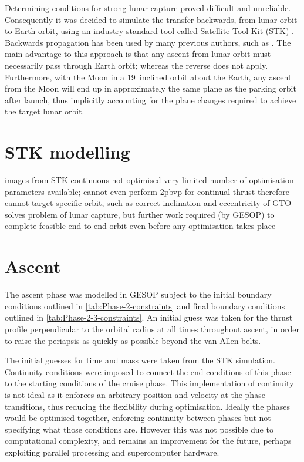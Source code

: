 Determining conditions for strong lunar capture proved difficult and unreliable. Consequently it was decided to simulate the transfer backwards, from lunar orbit to Earth orbit, using an industry standard tool called Satellite Tool Kit (STK) \parencite{STK}. Backwards propagation has been used by many previous authors, such as \textcite{Author}. The main advantage to this approach is that any ascent from lunar orbit must necessarily pass through Earth orbit; whereas the reverse does not apply. Furthermore, with the Moon in a 19\degrees\ inclined orbit about the Earth, any ascent from the Moon will end up in approximately the same plane as the parking orbit after launch, thus implicitly accounting for the plane changes required to achieve the target lunar orbit.

\clearpage

\section{STK modelling}

images from STK
continuous
not optimised
very limited number of optimisation parameters available; cannot even perform 2pbvp for continual thrust
therefore cannot target specific orbit, such as correct inclination and eccentricity of GTO
solves problem of lunar capture, but further work required (by GESOP) to complete feasible end-to-end orbit even before any optimisation takes place

\section{Ascent} 
The ascent phase was modelled in GESOP subject to the initial boundary conditions outlined in \autoref{tab:Phase-2-constraints} and final boundary conditions outlined in \autoref{tab:Phase-2-3-constraints}. An initial guess was taken for the thrust profile perpendicular to the orbital radius at all times throughout ascent, in order to raise the periapsis as quickly as possible beyond the van Allen belts.

The initial guesses for time and mass were taken from the STK simulation. Continuity conditions were imposed to connect the end conditions of this phase to the starting conditions of the cruise phase. This implementation of continuity is not ideal as it enforces an arbitrary position and velocity at the phase transitions, thus reducing the flexibility during optimisation. Ideally the phases would be optimised together, enforcing continuity between phases but not specifying what those conditions are. However this was not possible due to computational complexity, and remains an improvement for the future, perhaps exploiting parallel processing and supercomputer hardware.

